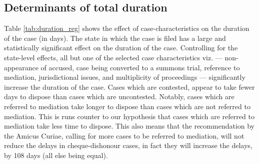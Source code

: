 
\subsection{Determinants of total duration}
\label{sec:determ-total-durat}

Table \ref{tab:duration_reg} shows the effect of case-characteristics on the duration of the case (in days). The state in which the case is filed has a large and statistically significant effect on the duration of the case. %
Controlling for the state-level effects, all but one of the selected case characteristics viz. --- non-appearance of accused, case being converted to a summons trial, reference to mediation, jurisdictional issues, and multiplicity of proceedings --- significantly increase the duration of the case. Cases which are contested, appear to take fewer days to dispose than cases which are uncontested. Notably, cases which are referred to mediation take longer to dispose than cases which are not referred to mediation. This is runs counter to our hypothesis that cases which are referred to mediation take less time to dispose. This also means that the recommendation by the Amicus Curiae, calling for more cases to be referred to mediation, will not reduce the delays in cheque-dishonour cases, in fact they will increase the delays, by 108 days (all else being equal).

